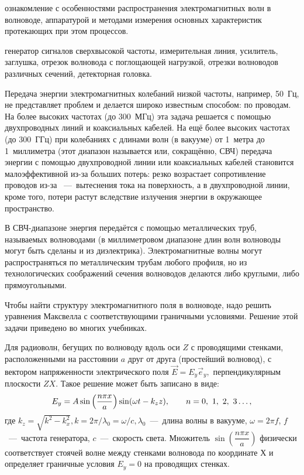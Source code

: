 \begin{lab:aim}
ознакомление с особенностями распространения электромагнитных волн в волноводе, аппаратурой и методами измерения основных характеристик протекающих при этом процессов.
\end{lab:aim}

\begin{lab:equipment}
генератор сигналов сверхвысокой частоты, измерительная линия, усилитель, заглушка, отрезок волновода с поглощающей нагрузкой, отрезки волноводов различных сечений, детекторная головка.
\end{lab:equipment}

Передача энергии электромагнитных колебаний низкой частоты, например, 50~Гц, не представляет проблем и делается широко известным способом: по проводам. На более высоких частотах (до 300~МГц) эта задача решается с помощью двухпроводных линий и коаксиальных кабелей. На ещё более высоких частотах (до 300~ГГц) при колебаниях с длинами волн (в вакууме) от 1~метра до 1~миллиметра (этот диапазон называется  или, сокращённо, СВЧ) передача энергии с помощью двухпроводной линии или коаксиальных кабелей становится малоэффективной из-за больших потерь: резко возрастает сопротивление проводов из-за ~---~вытеснения тока на поверхность, а в двухпроводной линии, кроме того, потери растут вследствие излучения энергии в окружающее пространство.

В СВЧ-диапазоне энергия передаётся с помощью металлических труб, называемых волноводами (в миллиметровом диапазоне длин волн волноводы могут быть сделаны и из диэлектрика). Электромагнитные волны могут распространяться по металлическим трубам любого профиля, но из технологических соображений сечения волноводов делаются либо круглыми, либо прямоугольными.

Чтобы найти структуру электромагнитного поля в волноводе, надо решить уравнения Максвелла с соответствующими граничными условиями. Решение этой задачи приведено во многих учебниках.

Для радиоволн, бегущих по волноводу вдоль оси $Z$ с проводящими стенками, расположенными на расстоянии $a$ друг от друга (простейший волновод), с вектором напряженности электрического поля $\vec E=E_y \vec e_y,$ перпендикулярным плоскости $ZX$. Такое решение может быть записано в виде:
\begin{equation}
	\eqmark{2.0.1}
	E_y=A\sin\left(\dfrac{n\pi x}{a}\right)\sin(\omega t-k_zz), \qquad n=0,~1,~2,~3 \ldots,
\end{equation}
где $k_z=\sqrt{k^2-k^2_x}, k=2\pi/\lambda_0=\omega/c, \lambda_0$~---~длина волны в вакууме, $\omega=2\pi f$, $f$~---~частота генератора, $c$~---~скорость света. Множитель $\sin\left(\dfrac{n\pi x}{a}\right)$ физически соответствует стоячей волне между стенками волновода по координате $Х$ и определяет граничные условия $E_y=0$ на проводящих стенках.
	

